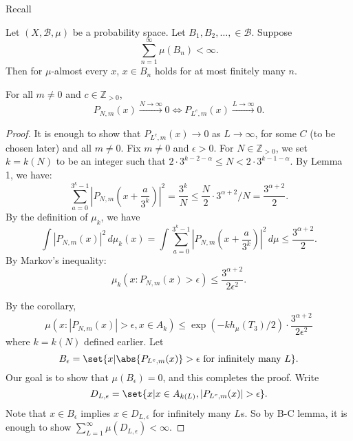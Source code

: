 \documentclass{article}
\newcommand{\B}{\mathcal{B}}
\begin{document}
Recall
\begin{lemma}
  Let $(X,\B,\mu)$ be a probability space. Let $B_1, B_2, \dotsc, \in \B$. Suppose
  \begin{equation*}
    \sum_{n =1}^\infty \mu(B_n) < \infty.
  \end{equation*}
  Then for $\mu$-almost every $x$, $x \in B_n$ holds for at most finitely many $n$.
\end{lemma}
\begin{lemma}
  For all $m \neq 0$ and $c \in \mathbb{Z}_{>0}$,
  \begin{equation*}
    P_{N,m}(x) \xrightarrow{N \to \infty} 0 \iff P_{L^c,m}(x) \xrightarrow{L \to \infty} 0.
  \end{equation*}
\end{lemma}
\begin{proof}
  It is enough to show that $P_{L^c,m}(x) \to 0$ as $L \to \infty$, for some $C$ (to be chosen later) and all $m \neq 0$.
  Fix $m \neq 0$ and $\epsilon > 0$. For $N \in \mathbb{Z}_{>0}$, we set $k = k(N)$ to be an integer such that $2 \cdot 3^{k-2-\alpha} \leq N < 2 \cdot 3^{k-1-\alpha}$.
  By Lemma 1, we have:
  \begin{equation*}
    \sum_{a=0}^{3^k-1} |P_{N,m}(x + \frac{a}{3^k})|^2 = \frac{3^k}{N} \leq \frac{N}{2} \cdot 3^{\alpha+2}/N = \frac{3^{\alpha+2}}{2}.
  \end{equation*}
  By the definition of $\mu_k$, we have
  \begin{equation*}
    \int |P_{N,m}(x)|^2 \, d\mu_k(x) = \int \sum_{a=0}^{3^k-1} |P_{N,m}(x + \frac{a}{3^k})|^2 \, d\mu \leq \frac{3^{\alpha+2}}{2}.
  \end{equation*}
  By Markov's inequality:
  \begin{equation*}
    \mu_k(x : P_{N,m}(x) > \epsilon) \leq \frac{3^{\alpha+2}}{2 \epsilon^2}.
  \end{equation*}

  By the corollary,
  \begin{equation*}
    \mu(x : |P_{N,m}(x)| > \epsilon, x \in A_{k}) \leq \exp(-k h_\mu(T_3)/2) \cdot \frac{3^{\alpha+2}}{2 \epsilon^2}
  \end{equation*}
  where $k = k(N)$ defined earlier.
  Let
  \begin{equation*}
    B_\epsilon = \set{x | \abs{P_{L^c, m}(x)} > \epsilon \text{ for infinitely many } L}.
  \end{equation*}
  Our goal is to show that $\mu(B_\epsilon) = 0$, and this completes the proof.
  Write
  \begin{equation*}
    D_{L,\epsilon} = \set{x | x \in A_{k(L)}, |P_{L^c, m}(x)| > \epsilon}.
  \end{equation*}
  Note that $x \in B_\epsilon$ implies $x \in D_{L,\epsilon}$ for infinitely many $L$s.
  So by B-C lemma, it is enough to show $\sum_{L=1}^\infty \mu(D_{L,\epsilon}) < \infty$.


\end{proof}
\end{document}
